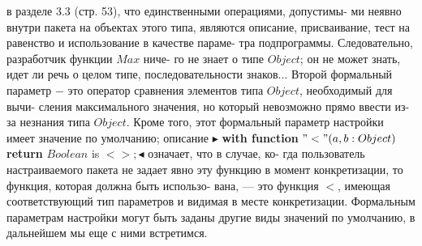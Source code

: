 \documentclass{./git_rep/mai_prac_2017/template/mai_book}
\begin{document}
в  разделе  3.3  (стр.  53),  что  единственными  операциями,  допустимы-\linebreak
ми неявно внутри пакета на объектах этого типа, являются описание,\linebreak
присваивание,  тест  на  равенство  и  использование  в  качестве  параме-\linebreak
тра  подпрограммы.  Следовательно,  разработчик  функции $Max$ ниче-\linebreak
го  не  знает  о  типе $Object$; он  не  может знать,  идет  ли  речь  о  целом\linebreak
типе,  последовательности  знаков...  Второй  формальный  параметр $-$\linebreak
это оператор сравнения элементов типа $Object$, необходимый для вычи-\linebreak
сления максимального значения,  но который невозможно прямо ввести\linebreak
из-за  незнания  типа $Object$. Кроме  того,  этот  формальный  параметр\linebreak
настройки  имеет  значение  по  умолчанию;  описание $\blacktriangleright$ \textbf{with function}\linebreak
$"<" (a,b : Object)$ \textbf{return} $Boolean$ is $<>; \blacktriangleleft$ означает,  что в случае,  ко-\linebreak
гда пользователь настраиваемого пакета не задает явно эту  функцию\linebreak
в момент конкретизации, то функция, которая должна быть использо-\linebreak
вана, — это функция $<$, имеющая соответствующий тип параметров и\linebreak
видимая в  месте  конкретизации.  Формальным параметрам настройки\linebreak
\newpage
\noindent
могут быть заданы другие виды значений по умолчанию, в дальнейшем\linebreak
мы еще с ними встретимся.\\
\end{document}
